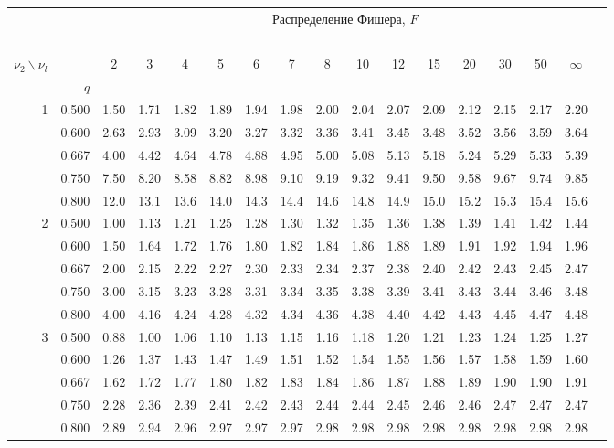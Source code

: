 \documentclass[pdftex,11pt,openany]{book}\usepackage[]{graphicx}\usepackage[]{color}
\begin{document}
{\scriptsize

\begin{center}
\begin{tabular}{rrr@{\,}r@{\,}r@{\,}r@{\,}r@{\,}r@{\,}r@{\,}r
                   @{\,}r@{\,}r@{\,}r@{\,}r@{\,}r@{\,}r@{\,}r}
&&\multicolumn{14}{c}{Распределение Фишера, $F$}\\
\ \\
$\nu_2\backslash\nu_l$ & & 
\multicolumn{1}{c}{2} &\multicolumn{1}{c}{3} &
\multicolumn{1}{c}{4} &\multicolumn{1}{c}{5} &
\multicolumn{1}{c}{6} &\multicolumn{1}{c}{7} &
\multicolumn{1}{c}{8} &\multicolumn{1}{c}{10}&
\multicolumn{1}{c}{12}&\multicolumn{1}{c}{15}&
\multicolumn{1}{c}{20}&\multicolumn{1}{c}{30}&
\multicolumn{1}{c}{50}&\multicolumn{1}{c}{$\infty$}\\
& $q$ \\
1&0.500&1.50&1.71&1.82&1.89&1.94&1.98&2.00&2.04&2.07&2.09&2.12&2.15&2.17&2.20\\
 &0.600&2.63&2.93&3.09&3.20&3.27&3.32&3.36&3.41&3.45&3.48&3.52&3.56&3.59&3.64\\
 &0.667&4.00&4.42&4.64&4.78&4.88&4.95&5.00&5.08&5.13&5.18&5.24&5.29&5.33&5.39\\
 &0.750&7.50&8.20&8.58&8.82&8.98&9.10&9.19&9.32&9.41&9.50&9.58&9.67&9.74&9.85\\
 &0.800&12.0&13.1&13.6&14.0&14.3&14.4&14.6&14.8&14.9&15.0&15.2&15.3&15.4&15.6\\
2&0.500&1.00&1.13&1.21&1.25&1.28&1.30&1.32&1.35&1.36&1.38&1.39&1.41&1.42&1.44\\
 &0.600&1.50&1.64&1.72&1.76&1.80&1.82&1.84&1.86&1.88&1.89&1.91&1.92&1.94&1.96\\
 &0.667&2.00&2.15&2.22&2.27&2.30&2.33&2.34&2.37&2.38&2.40&2.42&2.43&2.45&2.47\\
 &0.750&3.00&3.15&3.23&3.28&3.31&3.34&3.35&3.38&3.39&3.41&3.43&3.44&3.46&3.48\\
 &0.800&4.00&4.16&4.24&4.28&4.32&4.34&4.36&4.38&4.40&4.42&4.43&4.45&4.47&4.48\\
3&0.500&0.88&1.00&1.06&1.10&1.13&1.15&1.16&1.18&1.20&1.21&1.23&1.24&1.25&1.27\\
 &0.600&1.26&1.37&1.43&1.47&1.49&1.51&1.52&1.54&1.55&1.56&1.57&1.58&1.59&1.60\\
 &0.667&1.62&1.72&1.77&1.80&1.82&1.83&1.84&1.86&1.87&1.88&1.89&1.90&1.90&1.91\\
 &0.750&2.28&2.36&2.39&2.41&2.42&2.43&2.44&2.44&2.45&2.46&2.46&2.47&2.47&2.47\\
 &0.800&2.89&2.94&2.96&2.97&2.97&2.97&2.98&2.98&2.98&2.98&2.98&2.98&2.98&2.98\\

\end{tabular}
\end{center}}
\end{document}

